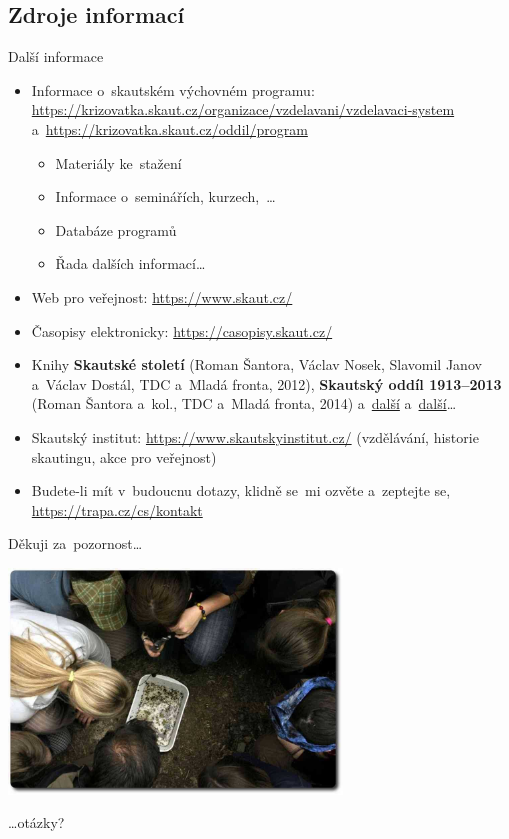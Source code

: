 \documentclass[compress, ucs, xelatex, 11pt, xcolor=dvipsnames, print,
	hyperref={
		bookmarks=true,
		unicode=true,
		colorlinks=true,
		pdftitle={Skautska vychovna metoda},
		plainpages=false,
		pdfauthor={Vojtech Zeisek},
		pdfsubject={Skautska vychovna metoda a jeji vyvoj za posledni stoleti a desetileti},
		pdfcreator={XeLaTeX},
		pdfkeywords={Junak, Pedagogika, Skaut, Skauting, Vychovna metoda},
		linkcolor=Black,
		anchorcolor=Black,
		citecolor=OliveGreen,
		filecolor=OliveGreen,
		menucolor=Black,
		urlcolor=OliveGreen,
		pdftex},
	url={hyphens, lowtilde} %
	]{beamer}
\begin{document}
\subsection{Zdroje informací}

\begin{frame}[allowframebreaks]{Další informace}
	\begin{itemize}
		\item Informace o~skautském výchovném programu: \url{https://krizovatka.skaut.cz/organizace/vzdelavani/vzdelavaci-system} a~\url{https://krizovatka.skaut.cz/oddil/program}
		\begin{itemize}
			\item Materiály ke~stažení
			\item Informace o~seminářích, kurzech,~\ldots
			\item Databáze programů
			\item Řada dalších informací\ldots
		\end{itemize}
		\item Web pro veřejnost: \url{https://www.skaut.cz/}
		\item Časopisy elektronicky: \url{https://casopisy.skaut.cz/}
		\item Knihy \textbf{Skautské století} (Roman Šantora, Václav Nosek, Slavomil Janov a~Václav Dostál, TDC a~Mladá fronta, 2012), \textbf{Skautský oddíl 1913--2013} (Roman Šantora a~kol., TDC a~Mladá fronta, 2014) a~\href{https://www.obchod.skaut.cz/propagace/publikace/}{další} a~\href{https://www.junshop.cz/volny-cas/knihy/}{další}\ldots
		\item Skautský institut: \url{https://www.skautskyinstitut.cz/} (vzdělávání, historie skautingu, akce pro veřejnost)
		\item Budete-li mít v~budoucnu dotazy, klidně se~mi ozvěte a~zeptejte se, \url{https://trapa.cz/cs/kontakt}
	\end{itemize}
\end{frame}

\begin{frame}{Děkuji za~pozornost\ldots}
	\begin{center}
		\includegraphics[height=6cm]{zaver.jpg}
	\end{center}
	\begin{flushright}
		\begin{large}
			\ldots otázky?
		\end{large}
	\end{flushright}
\end{frame}
\end{document}
